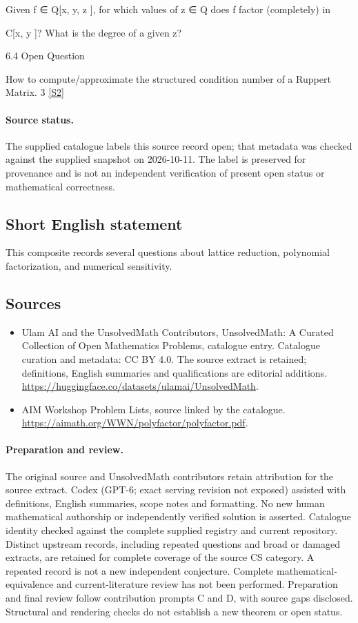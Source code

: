 \documentclass[11pt]{article}
\newcommand{\sref}[2]{\hyperlink{source:#1:#2}{[S#2]}}
\begin{document}
Given f ∈ Q[x, y, z ], for which values of z ∈ Q does f factor (completely) in

C[x, y ]? What is the degree of a given z?

6.4 Open Question

How to compute/approximate the structured condition number of a Ruppert Matrix. 3 \sref{statement}{2}
\paragraph{Source status.}
The supplied catalogue labels this source record open; that metadata was checked against the supplied snapshot on 2026-10-11. The label is preserved for provenance and is not an independent verification of present open status or mathematical correctness.
\subsection{Short English statement}
This composite records several questions about lattice reduction, polynomial factorization, and numerical sensitivity.
\subsection{Sources}
\begin{itemize}
\item[\hypertarget{source:statement:1}{S1}] Ulam AI and the UnsolvedMath Contributors, UnsolvedMath: A Curated Collection of Open Mathematics Problems, catalogue entry. Catalogue curation and metadata: CC BY 4.0. The source extract is retained; definitions, English summaries and qualifications are editorial additions.
\url{https://huggingface.co/datasets/ulamai/UnsolvedMath}.
\item[\hypertarget{source:statement:2}{S2}] AIM Workshop Problem Lists, source linked by the catalogue.
\url{https://aimath.org/WWN/polyfactor/polyfactor.pdf}.
\end{itemize}
\paragraph{Preparation and review.}
The original source and UnsolvedMath contributors retain attribution for the source extract. Codex (GPT-6; exact serving revision not exposed) assisted with definitions, English summaries, scope notes and formatting. No new human mathematical authorship or independently verified solution is asserted. Catalogue identity checked against the complete supplied registry and current repository. Distinct upstream records, including repeated questions and broad or damaged extracts, are retained for complete coverage of the source CS category. A repeated record is not a new independent conjecture. Complete mathematical-equivalence and current-literature review has not been performed. Preparation and final review follow contribution prompts C and D, with source gaps disclosed. Structural and rendering checks do not establish a new theorem or open status.
\label{end:statement}
\end{document}
